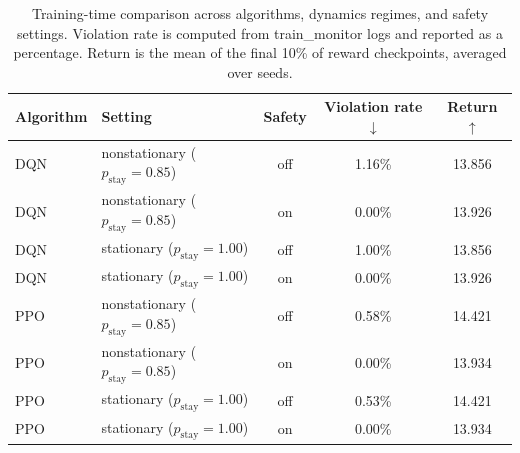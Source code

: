\begin{table}[t]
\centering
\small
\begin{tabular}{llccc}
\toprule
Algorithm & Setting & Safety & Violation rate $\downarrow$ & Return $\uparrow$ \\
\midrule
DQN & nonstationary ($p_{\mathrm{stay}}=0.85$) & off & 1.16\% & 13.856 \\
DQN & nonstationary ($p_{\mathrm{stay}}=0.85$) & on & 0.00\% & 13.926 \\
DQN & stationary ($p_{\mathrm{stay}}=1.00$) & off & 1.00\% & 13.856 \\
DQN & stationary ($p_{\mathrm{stay}}=1.00$) & on & 0.00\% & 13.926 \\
PPO & nonstationary ($p_{\mathrm{stay}}=0.85$) & off & 0.58\% & 14.421 \\
PPO & nonstationary ($p_{\mathrm{stay}}=0.85$) & on & 0.00\% & 13.934 \\
PPO & stationary ($p_{\mathrm{stay}}=1.00$) & off & 0.53\% & 14.421 \\
PPO & stationary ($p_{\mathrm{stay}}=1.00$) & on & 0.00\% & 13.934 \\
\bottomrule
\end{tabular}
\caption{Training-time comparison across algorithms, dynamics regimes, and safety settings. Violation rate is computed from train\_monitor logs and reported as a percentage. Return is the mean of the final 10\% of reward checkpoints, averaged over seeds.}
\label{tab:main_results_compare}
\end{table}